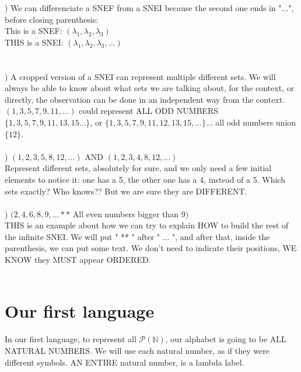 		) We can differenciate a SNEF from a SNEI because the second one ends in "...", before closing parenthesis:\\
		This is a SNEF: $(\lambda_{1}, \lambda_{2}, \lambda_{3})$\\
		THIS is a SNEI: $(\lambda_{1}, \lambda_{2}, \lambda_{3}, ...)$\\
		\\\\
		
		) A cropped version of a SNEI can represent multiple different sets. We will always be able to know about what sets we are talking about, for the context, or directly, the observation can be done in an independent way from the context. $(1,3,5,7,9,11,...)$ could represent ALL ODD NUMBERS $\{1,3,5,7,9,11,13,15...\}$, or $\{1,3,5,7,9,11,12,13,15, ...\}$... all odd numbers union $\{12\}$.
		\\\\

		) $(1,2,3,5,8,12,...)$ AND $(1,2,3,4,8,12,...)$\\
		Represent different sets, absolutely for sure, and we only need a few initial elements to notice it: one has a 5, the other one has a 4, instead of a 5. Which sets exactly? Who knows?? But we are sure they are DIFFERENT.
		\\\\
		
		) $(2,4,6,8,9,... **$ All even numbers bigger than 9$)$\\
		THIS is an example about how we can try to explain HOW to build the rest of the infinite SNEI. We will put " ** " after " ... ", and after that, inside the parenthesis, we can put some text. We don't need to indicate their positions, WE KNOW they MUST appear ORDERED.
		\\\\
		
	\section{Our first language}
		
		\noindent
		In our first language, to represent all $\mathcal{P}(\mathbb{N})$, our alphabet is going to be ALL NATURAL NUMBERS. We will use each natural number, as if they were different symbols. AN ENTIRE natural number, is a lambda label.
		\\\\
		
